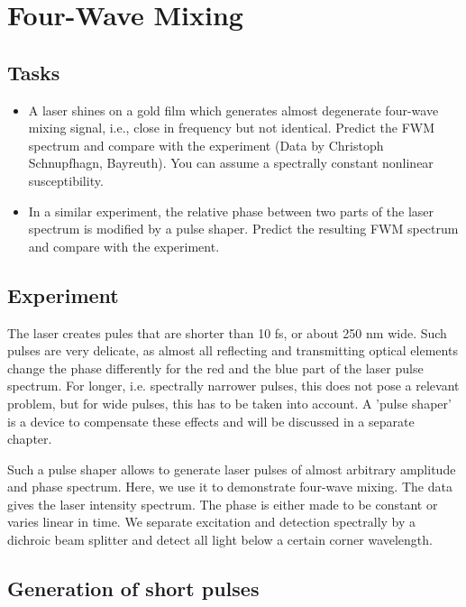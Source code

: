 \chapter{Four-Wave Mixing}


\section{Tasks}

\begin{itemize}
\item A laser shines on a gold film which generates almost degenerate four-wave mixing signal, i.e., close in frequency but not identical. Predict the FWM spectrum and compare with the experiment (Data by Christoph Schnupfhagn, Bayreuth). You can assume a spectrally constant nonlinear  susceptibility.

\item In a similar experiment, the relative phase between two parts of the laser spectrum is modified by a pulse shaper. Predict the resulting FWM spectrum and compare with the experiment.
\end{itemize}

\section{Experiment}

The laser creates pules that are shorter than 10 fs, or about 250 nm wide. Such pulses are very delicate, as almost all reflecting and transmitting optical elements change the phase differently for the red and the blue part of the laser pulse spectrum. For longer, i.e. spectrally narrower pulses, this does not pose a relevant problem, but for wide pulses, this has to be taken into account. A 'pulse shaper' is a device to compensate these effects and will be discussed in a separate chapter.

Such a pulse shaper allows to generate laser pulses of almost arbitrary amplitude and phase spectrum. Here, we use it to demonstrate four-wave mixing. The data gives the laser intensity spectrum. The phase is either made to be constant or varies linear  in time.
We separate excitation and detection spectrally by a dichroic beam splitter and detect all light below a certain corner wavelength. 

\section{Generation of short pulses}


